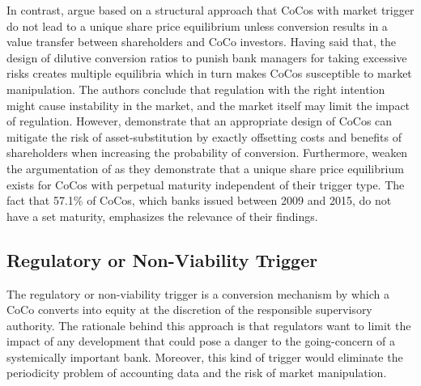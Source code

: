 In contrast, \citet{sundaresan2015design} argue based on a structural approach that CoCos with market trigger do not lead to a unique share price equilibrium unless conversion results in a value transfer between shareholders and CoCo investors. Having said that, the design of dilutive conversion ratios to punish bank managers for taking excessive risks creates multiple equilibria which in turn makes CoCos susceptible to market manipulation. The authors conclude that regulation with the right intention might cause instability in the market, and the market itself may limit the impact of regulation. However, \citet{hilscher2014bank} demonstrate that an appropriate design of CoCos can mitigate the risk of asset-substitution by exactly offsetting costs and benefits of shareholders when increasing the probability of conversion. Furthermore, \citet{pennacchi2015reexamination} weaken the argumentation of \citet{sundaresan2015design} as they demonstrate that a unique share price equilibrium exists for CoCos with perpetual maturity independent of their trigger type. The fact that 57.1\% of CoCos, which banks issued between 2009 and 2015, do not have a set maturity, emphasizes the relevance of their findings. \citep{europeanparliament2016}


\subsection{Regulatory or Non-Viability Trigger} \label{regulatorytrigger}

The regulatory or non-viability trigger is a conversion mechanism by which a CoCo converts into equity at the discretion of the responsible supervisory authority. The rationale behind this approach is that regulators want to limit the impact of any development that could pose a danger to the going-concern of a systemically important bank. \citep{erismann2015pricing} Moreover, this kind of trigger would eliminate the periodicity problem of accounting data and the risk of market manipulation.\\ 

